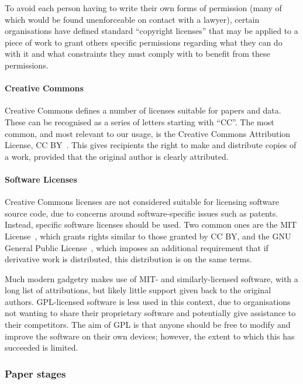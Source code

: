 \documentclass{article}
\begin{document}
To avoid each person having to write their own forms of permission
(many of which would be found unenforceable on contact with a lawyer),
certain organisations have defined standard ``copyright licenses''
that may be applied to a piece of work
to grant others specific permissions regarding what they can do with it
and what constraints they must comply with to benefit from these permissions.

\paragraph{Creative Commons}

Creative Commons defines a number of licenses suitable for papers and data.
These can be recognised as a series of letters starting with ``CC''.
The most common,
and most relevant to our usage,
is the Creative Commons Attribution License,
CC BY~\cite{cc-by}.
This gives recipients the right to make and distribute copies of a work,
provided that the original author is clearly attributed.

\paragraph{Software Licenses}

Creative Commons licenses are not considered
suitable for licensing software source code,
due to concerns around software-specific issues such as patents.
Instead,
specific software licenses should be used.
Two common ones are the MIT License~\cite{mit},
which grants rights similar to those granted by CC BY,
and the GNU General Public License~\cite{gpl},
which imposes an additional requirement that
if derivative work is distributed,
this distribution is on the same terms.

Much modern gadgetry makes use of MIT- and similarly-licensed software,
with a long list of attributions,
but likely little support given back to the original authors.
GPL-licensed software is less used in this context,
due to organisations not wanting to share their proprietary software
and potentially give assistance to their competitors.
The aim of GPL is that
anyone should be free to modify and improve the software on their own devices;
however,
the extent to which this has succeeded is limited.

\subsubsection{Paper stages}
\end{document}
